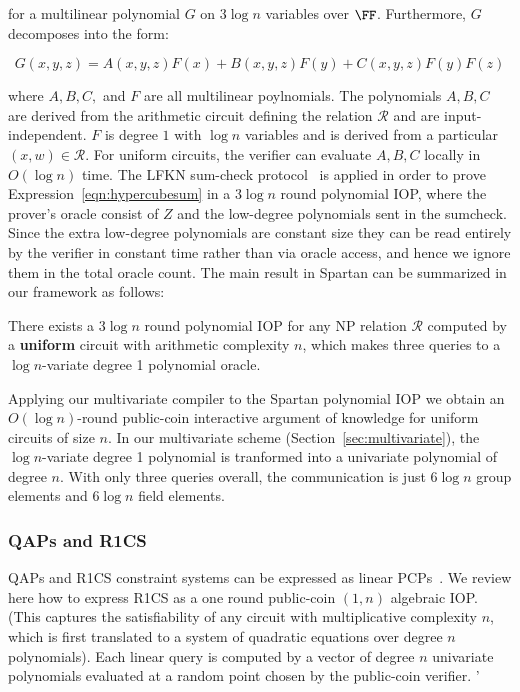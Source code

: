 for a multilinear polynomial $G$ on $3 \log n$ variables over $\FF$. 
Furthermore, $G$ decomposes into the form: 

$$G(x,y,z) = A(x,y,z) F(x) + B(x, y, z) F(y) + C(x, y, z) F(y) F(z)$$

where $A, B, C,$ and $F$ are all multilinear poylnomials. The polynomials $A, B, C$ are derived from the arithmetic circuit defining the relation $\mathcal{R}$ and are input-independent. $F$ is degree $1$ with $\log n$ variables and is derived from a particular $(x, w) \in \mathcal{R}$. For uniform circuits, the verifier can evaluate $A, B, C$ locally in $O(\log n )$ time. The LFKN sum-check protocol~\cite{FOCS:LFKN90} is applied in order to prove Expression~\ref{eqn:hypercubesum} in a $3\log n$ round polynomial IOP, where the prover's oracle consist of $Z$ and the low-degree polynomials sent in the sumcheck. Since the extra low-degree polynomials are constant size they can be read entirely by the verifier in constant time rather than via oracle access, and hence we ignore them in the total oracle count. The main result in Spartan can be summarized in our framework as follows: 

\begin{theorem}[Setty19]
There exists a $3 \log n$ round polynomial IOP for any NP relation $\mathcal{R}$ computed by a \textbf{uniform} circuit with arithmetic complexity $n$, which makes three queries to a $\log n$-variate degree 1 polynomial oracle.  
\end{theorem}

Applying our multivariate compiler to the \textsf{Spartan} polynomial IOP we obtain an $O(\log n)$-round public-coin interactive argument of knowledge for uniform circuits of size $n$. In our multivariate scheme (Section~\ref{sec:multivariate}), the $\log n$-variate degree 1 polynomial is tranformed into a univariate polynomial of degree $n$. With only three queries overall, the communication is just $6 \log n$ group elements and $6 \log n$ field elements. 

\subsubsection{QAPs and R1CS} 

QAPs and R1CS constraint systems can be expressed as linear PCPs~\cite{TCC:BCIOP13,C:BCGTV13}. We review here how to express R1CS as a one round public-coin $(1, n)$ algebraic IOP. (This captures the satisfiability of any circuit with multiplicative complexity $n$, which is first translated to a system of quadratic equations over degree $n$ polynomials). Each linear query is computed by a vector of degree $n$ univariate polynomials evaluated at a random point chosen by the public-coin verifier. '

